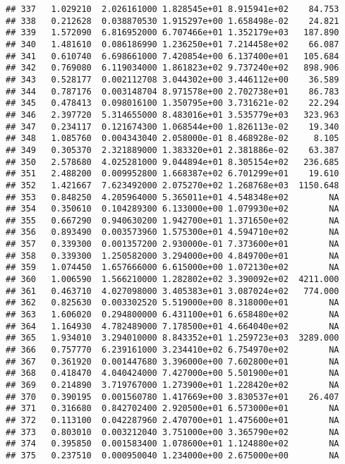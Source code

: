 \documentclass[
]{article}
\begin{document}
\begin{verbatim}
## 337   1.029210  2.026161000 1.828545e+01 8.915941e+02    84.753
## 338   0.212628  0.038870530 1.915297e+00 1.658498e-02    24.821
## 339   1.572090  6.816952000 6.707466e+01 1.352179e+03   187.890
## 340   1.481610  0.086186990 1.236250e+01 7.214458e+02    66.087
## 341   0.610740  6.698661000 7.420854e+00 6.137400e+01   105.684
## 342   0.769080  6.119034000 1.861823e+02 9.737240e+02   898.906
## 343   0.528177  0.002112708 3.044302e+00 3.446112e+00    36.589
## 344   0.787176  0.003148704 8.971578e+00 2.702738e+01    86.783
## 345   0.478413  0.098016100 1.350795e+00 3.731621e-02    22.294
## 346   2.397720  5.314655000 8.483016e+01 3.535779e+03   323.963
## 347   0.234117  0.121674300 1.068544e+00 1.826113e-02    19.340
## 348   1.085760  0.004343040 2.058000e-01 8.468928e-02     8.105
## 349   0.305370  2.321889000 1.383320e+01 2.381886e-02    63.387
## 350   2.578680  4.025281000 9.044894e+01 8.305154e+02   236.685
## 351   2.488200  0.009952800 1.668387e+02 6.701299e+01    19.610
## 352   1.421667  7.623492000 2.075270e+02 1.268768e+03  1150.648
## 353   0.848250  4.205964000 5.365011e+01 4.548348e+02        NA
## 354   0.350610  0.104289300 6.133000e+00 1.079930e+02        NA
## 355   0.667290  0.940630200 1.942700e+01 1.371650e+02        NA
## 356   0.893490  0.003573960 1.575300e+01 4.594710e+02        NA
## 357   0.339300  0.001357200 2.930000e-01 7.373600e+01        NA
## 358   0.339300  1.250582000 3.294000e+00 4.849700e+01        NA
## 359   1.074450  1.657666000 6.615000e+00 1.072130e+02        NA
## 360   1.006590  1.566210000 1.282802e+02 3.390092e+02  4211.000
## 361   0.463710  4.027098000 3.405383e+01 3.087024e+02   774.000
## 362   0.825630  0.003302520 5.519000e+00 8.318000e+01        NA
## 363   1.606020  0.294800000 6.431100e+01 6.658480e+02        NA
## 364   1.164930  4.782489000 7.178500e+01 4.664040e+02        NA
## 365   1.934010  3.294010000 8.843352e+01 1.259723e+03  3289.000
## 366   0.757770  6.239161000 3.234410e+02 6.754970e+02        NA
## 367   0.361920  0.001447680 3.396000e+00 7.602800e+01        NA
## 368   0.418470  4.040424000 7.427000e+00 5.501900e+01        NA
## 369   0.214890  3.719767000 1.273900e+01 1.228420e+02        NA
## 370   0.390195  0.001560780 1.417669e+00 3.830537e+01    26.407
## 371   0.316680  0.842702400 2.920500e+01 6.573000e+01        NA
## 372   0.113100  0.042287960 2.470700e+01 1.475600e+01        NA
## 373   0.803010  0.003212040 3.751000e+00 3.365790e+02        NA
## 374   0.395850  0.001583400 1.078600e+01 1.124880e+02        NA
## 375   0.237510  0.000950040 1.234000e+00 2.675000e+00        NA

\end{verbatim}
\end{document}
